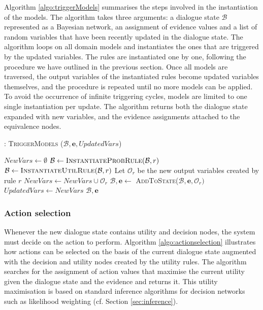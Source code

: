 Algorithm \ref{algo:triggerModels} summarises the steps involved in the instantiation of the models. The algorithm takes three arguments: a dialogue state $\mathcal{B}$ represented as a Bayesian network, an assignment of evidence values and a list of random variables that have been recently updated in the dialogue state. The algorithm loops on all domain models and instantiates the ones that are triggered by the updated variables. The rules are instantiated one by one, following the procedure we have outlined in the previous section. Once all models are traversed, the output variables of the instantiated rules become updated variables themselves, and the procedure is repeated until no more models can be applied.  To avoid the occurrence of infinite triggering cycles, models are limited to one single instantiation per update. The algorithm returns both the dialogue state expanded with new variables, and the evidence assignments attached to the equivalence nodes. 


\begin{algorithm}[t]
\caption{: \textsc{TriggerModels} ($\mathcal{B}, \mathbf{e}, \mathit{UpdatedVars}$)}
\begin{algorithmic}[1] \vspace{1mm}
\STATE $\mathit{NewVars} \leftarrow \emptyset$
\STATE $\mathcal{B} \leftarrow \textsc{InstantiateProbRule}(\mathcal{B},r)$
\STATE $\mathcal{B} \leftarrow \textsc{InstantiateUtilRule}(\mathcal{B},r)$
\ENDIF
\STATE Let $\mathcal{O}_r$ be the new output variables created by rule $r$
\STATE $\mathit{NewVars} \leftarrow \mathit{NewVars} \cup \mathcal{O}_r$
\STATE $\mathcal{B}, \mathbf{e} \leftarrow $ \textsc{AddToState}($\mathcal{B}, \mathbf{e}, \mathcal{O}_r)$
\ENDFOR
\ENDIF
\ENDFOR 
\STATE $\mathit{UpdatedVars} \leftarrow \mathit{NewVars}$
\ENDWHILE 
\RETURN $\mathcal{B}, \mathbf{e}$
\end{algorithmic}
\label{algo:triggerModels}
\end{algorithm}


\subsubsection*{Action selection}

Whenever the new dialogue state contains utility and decision nodes, the system must decide on the action to perform.  Algorithm \ref{algo:actionselection} illustrates how actions can be selected on the basis of the current dialogue state augmented with the decision and utility nodes created by the utility rules. The algorithm searches for the assignment of action values that maximise the current utility given the dialogue state and the evidence and returns it. This utility maximisation is based on standard inference algorithms for decision networks such as likelihood weighting (cf. Section \ref{sec:inference}). 

